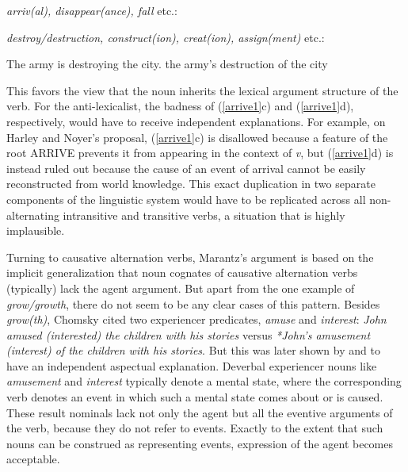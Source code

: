 \begin{exe}\ex
\label{arrive1} 
\emph{arriv(al), disappear(ance), fall} etc.:
\begin{xlist}[iv.]
\zl

\begin{exe}\ex
\label{trans}
\emph{destroy/destruction, construct(ion), creat(ion), assign(ment)} etc.:
\begin{xlist}[iv.]
\ex The army is destroying the city.
\ex the army's destruction of the city
\zl

\noindent
This favors the view that the noun inherits the lexical argument structure of the verb.  For the
anti-lexicalist, the badness of (\ref{arrive1}c) and (\ref{arrive1}d), respectively, would have to
receive independent explanations.  For example, on Harley and Noyer's \citeyear{HN2000a} proposal,
(\ref{arrive1}c) is disallowed because a feature of the root ARRIVE prevents it from appearing in
the context of \emph{v}, but (\ref{arrive1}d) is instead ruled out because the cause of an event of
arrival cannot be easily reconstructed from world knowledge.  This exact duplication in two separate
components of the linguistic system would have to be replicated across all non-alternating
intransitive and transitive verbs, a situation that is highly implausible.

Turning to causative alternation verbs, Marantz's argument is based on the implicit generalization
that noun cognates of causative alternation verbs (typically) lack the agent argument.  But apart
from the one example of \emph{grow/growth}, there do not seem to be any clear cases of this pattern.
Besides \emph{grow(th)}, Chomsky \citeyear[examples (7c) and (8c)]{Chomsky70a} cited two experiencer
predicates, \emph{amuse} and \emph{interest}:  \emph{John amused (interested) the children with his
  stories}  versus  \emph{*John's amusement (interest) of the children with his stories}.   But this
was later shown by \citet{Rappaport83a-u} and \citet{Dowty89b-u} to have an
independent aspectual explanation.  Deverbal experiencer nouns like \emph{amusement} and
\emph{interest} typically denote a mental state, where the corresponding verb denotes an event in
which such a mental state comes about or is caused.   These result nominals lack not only the agent
but all the eventive arguments of the verb, because they do not refer to events.  Exactly to the
extent that such nouns can be construed as representing events, expression of the agent becomes
acceptable.   


\end{xlist}
\end{exe}
\end{xlist}
\end{exe}
